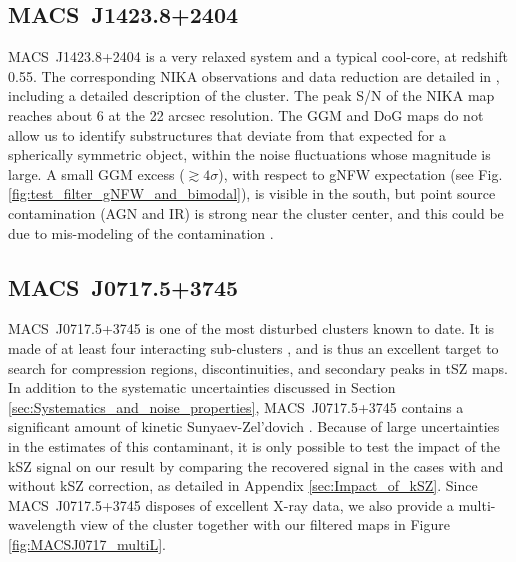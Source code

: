 \documentclass[traditabstract]{aa}
\begin{document}
\subsection{MACS~J1423.8+2404}
\mbox{MACS~J1423.8+2404} is a very relaxed system and a typical cool-core, at redshift 0.55. The corresponding NIKA observations and data reduction are detailed in \cite{Adam2016a}, including a detailed description of the cluster. The peak S/N of the NIKA map reaches about 6 at the 22 arcsec resolution. The GGM and DoG maps do not allow us to identify substructures that deviate from that expected for a spherically symmetric object, within the noise fluctuations whose magnitude is large. A small GGM excess ($\gtrsim 4 \sigma$), with respect to gNFW expectation (see Fig. \ref{fig:test_filter_gNFW_and_bimodal}), is visible in the south, but point source contamination (AGN and IR) is strong near the cluster center, and this could be due to mis-modeling of the contamination \citep[see][and the discussion of Sect. \ref{sec:Point_sources_residuals}]{Adam2016a}.

\subsection{MACS~J0717.5+3745}\label{sec:MACSJ0717}
\mbox{MACS~J0717.5+3745} is one of the most disturbed clusters known to date. It is made of at least four interacting sub-clusters \citep{Ma2009}, and is thus an excellent target to search for compression regions, discontinuities, and secondary peaks in tSZ maps. In addition to the systematic uncertainties discussed in Section \ref{sec:Systematics_and_noise_properties}, \mbox{MACS~J0717.5+3745} contains a significant amount of kinetic Sunyaev-Zel'dovich \citep[kSZ,][]{Sunyaev1980}. Because of large uncertainties in the estimates of this contaminant, it is only possible to test the impact of the kSZ signal on our result by comparing the recovered signal in the cases with and without kSZ correction, as detailed in Appendix \ref{sec:Impact_of_kSZ}. Since \mbox{MACS~J0717.5+3745} disposes of excellent X-ray data, we also provide a multi-wavelength view of the cluster together with our filtered maps in Figure \ref{fig:MACSJ0717_multiL}.
\end{document}
